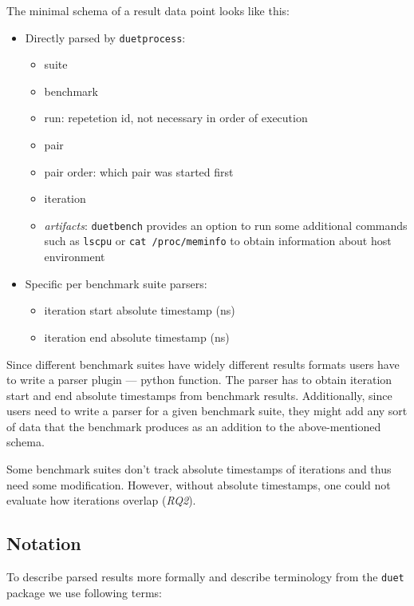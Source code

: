 The minimal schema of a result data point looks like this:
\begin{itemize}
    \item Directly parsed by \lstinline{duetprocess}:
        \begin{itemize}
            \item suite
            \item benchmark
            \item run: repetetion id, not necessary in  order of execution
            \item pair
            \item pair order: which pair was started first
            \item iteration
            \item \emph{artifacts}: \lstinline{duetbench} provides an option to run some additional commands such as \lstinline{lscpu} or \lstinline{cat /proc/meminfo} to obtain information about host environment
        \end{itemize}
    \item Specific per benchmark suite parsers:
        \begin{itemize}
            \item iteration start absolute timestamp (ns)
            \item iteration end absolute timestamp (ns)
        \end{itemize}
\end{itemize}

Since different benchmark suites have widely different results formats users have to write a parser plugin --- python function.
The parser has to obtain iteration start and end absolute timestamps from benchmark results. 
Additionally, since users need to write a parser for a given benchmark suite, they might add any sort of data that the benchmark produces as an addition to the above-mentioned schema.

Some benchmark suites don't track absolute timestamps of iterations and thus need some modification.
However, without absolute timestamps, one could not evaluate how iterations overlap (\emph{RQ2}).

\subsection{Notation}
\label{sec:notation}

To describe parsed results more formally and describe terminology from the \lstinline{duet} package we use following terms:

